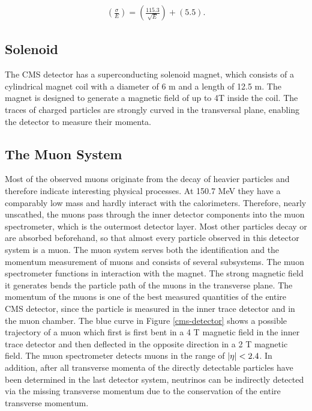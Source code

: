 \documentclass[12pt, a4paper]{thesis}
\begin{document}
\begin{align}
  \left( \frac{\sigma}{E} \right) = \left( \frac{115.3}{\sqrt{E}} \right) + (5.5).
\end{align}

\subsection{Solenoid}
\label{sec:org004c39a}
The CMS detector has a superconducting solenoid magnet, which consists
of a cylindrical magnet coil with a diameter of 6 m and a length of
12.5 m.  The magnet is designed to generate a magnetic field of up to
4T inside the coil. The traces of charged particles are strongly
curved in the transversal plane, enabling the detector to measure
their momenta.

\subsection{The Muon System}
\label{sec:org643030a}

Most of the observed muons originate from the decay of heavier
particles and therefore indicate interesting physical processes. At
150.7 MeV they have a comparably low mass and hardly interact with the
calorimeters.  Therefore, nearly unscathed, the muons pass through the
inner detector components into the muon spectrometer, which is the
outermost detector layer. Most other particles decay or are absorbed
beforehand, so that almost every particle observed in this detector
system is a muon. The muon system serves both the identification and
the momentum measurement of muons and consists of several subsystems.
The muon spectrometer functions in interaction with the magnet. The
strong magnetic field it generates bends the particle path of the
muons in the transverse plane. The momentum of the muons is one of the
best measured quantities of the entire CMS detector, since the
particle is measured in the inner trace detector and in the muon
chamber. The blue curve in Figure \ref{cms-detector} shows a possible
trajectory of a muon which first is first bent in a 4 T magnetic field
in the inner trace detector and then deflected in the opposite
direction in a 2 T magnetic field. The muon spectrometer detects muons
in the range of \(\abs{\eta} < 2.4\). In addition, after all
transverse momenta of the directly detectable particles have been
determined in the last detector system, neutrinos can be indirectly
detected via the missing transverse momentum due to the conservation
of the entire transverse momentum.
\end{document}
